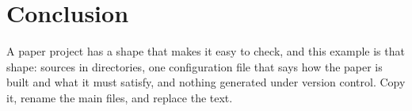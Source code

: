 \section{Conclusion}

A paper project has a shape that makes it easy to check, and this example is
that shape: sources in directories, one configuration file that says how the
paper is built and what it must satisfy, and nothing generated under version
control. Copy it, rename the main files, and replace the text.
